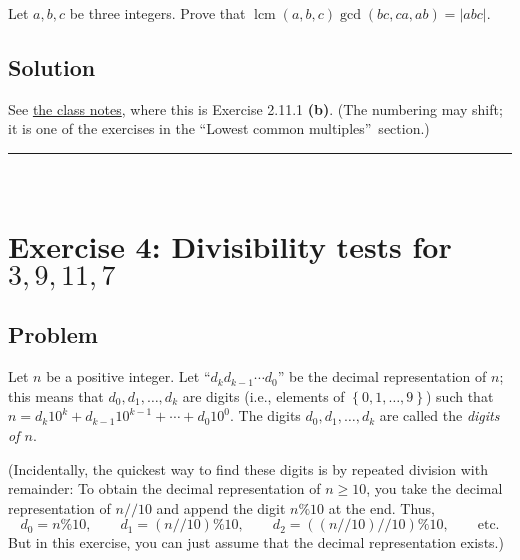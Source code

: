 \documentclass[paper=a4, fontsize=12pt]{scrartcl}%
\theoremstyle{plainsl}
\theoremstyle{definition}
\theoremstyle{remark}
\begin{document}
Let $a, b, c$ be three integers. Prove that $\operatorname{lcm}\left(  a, b, c
\right)  \gcd\left(  bc, ca, ab \right)  = \left|  abc \right|  $.

\subsection{Solution}

See \href{http://www-users.math.umn.edu/~dgrinber/19s/notes.pdf}{the class
notes}, where this is Exercise 2.11.1 \textbf{(b)}. (The numbering may shift;
it is one of the exercises in the \textquotedblleft Lowest common
multiples\textquotedblright\ section.)

\rule{\linewidth}{0.3pt} \\[0.4cm]

\section{Exercise 4: Divisibility tests for $3, 9, 11, 7$}

\subsection{Problem}

Let $n$ be a positive integer. Let ``$d_{k} d_{k-1} \cdots d_{0}$'' be the
decimal representation of $n$; this means that $d_{0}, d_{1}, \ldots, d_{k}$
are digits (i.e., elements of $\left\{  0, 1, \ldots, 9 \right\}  $) such that
$n = d_{k} 10^{k} + d_{k-1} 10^{k-1} + \cdots+ d_{0} 10^{0}$. The digits
$d_{0}, d_{1}, \ldots, d_{k}$ are called the \textit{digits of $n$}.

(Incidentally, the quickest way to find these digits is by repeated division
with remainder: To obtain the decimal representation of $n \geq10$, you take
the decimal representation of $n // 10$ and append the digit $n \% 10$ at the
end. Thus,
\[
d_{0} = n \% 10, \qquad d_{1} = \left(  n // 10 \right)  \% 10, \qquad d_{2} =
\left(  \left(  n // 10 \right)  // 10 \right)  \% 10, \qquad\text{etc.}
\]
But in this exercise, you can just assume that the decimal representation exists.)
\end{document}
